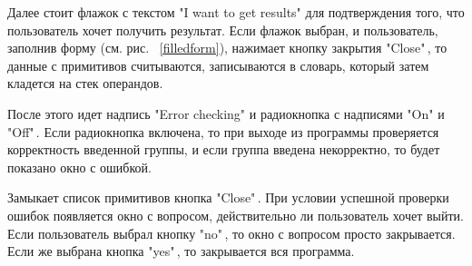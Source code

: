 \documentclass[14pt]{extarticle}
\begin{document}
	Далее стоит флажок с текстом "I want to get results"\,\,для подтверждения того, что пользователь хочет получить результат. Если флажок выбран, и  пользователь, заполнив форму (см. рис. ~\ref{filledform}), нажимает кнопку закрытия "Close"\,, то данные с примитивов считываются, записываются в словарь, который затем кладется на стек операндов.
	
	После этого идет надпись "Error checking"\,\,и радиокнопка с надписями "On"\,\,и "Off"\,. Если радиокнопка включена, то при выходе из программы проверяется корректность введенной группы, и если группа введена некорректно, то будет показано окно с ошибкой.	
	
	Замыкает список примитивов кнопка "Close"\,. При условии успешной проверки ошибок появляется окно с вопросом, действительно ли пользователь хочет выйти. Если пользователь выбрал кнопку "no"\,, то окно с вопросом просто закрывается. Если же выбрана кнопка "yes"\,, то закрывается вся программа.
	
\end{document}
